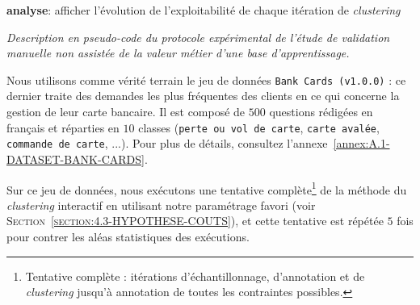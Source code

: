 			\begin{algorithm}
				\textbf{analyse}: afficher l'évolution de l'exploitabilité de chaque itération de \textit{clustering} \;
				\caption{\textit{
					Description en pseudo-code du protocole expérimental de l'étude de validation manuelle non assistée de la valeur métier d'une base d'apprentissage.
				}}
				\label{algorithm:4.4.1-ETUDE-PERTINENCE-VALIDATION-MANUELLE-PROTOCOLE}
			\end{algorithm}
			
			Nous utilisons comme vérité terrain le jeu de données \texttt{Bank Cards (v1.0.0)} : ce dernier traite des demandes les plus fréquentes des clients en ce qui concerne la gestion de leur carte bancaire.
			Il est composé de $500$ questions rédigées en français et réparties en $10$ classes (\texttt{perte ou vol de carte}, \texttt{carte avalée}, \texttt{commande de carte}, ...).
			Pour plus de détails, consultez l'annexe~\ref{annex:A.1-DATASET-BANK-CARDS}.
			
			Sur ce jeu de données, nous exécutons une tentative complète\footnote{
				Tentative complète : itérations d'échantillonnage, d'annotation et de \textit{clustering} jusqu'à annotation de toutes les contraintes possibles.
			}
			de la méthode du \textit{clustering} interactif en utilisant notre paramétrage favori (voir \textsc{Section~\ref{section:4.3-HYPOTHESE-COUTS}}), et cette tentative est répétée $5$ fois pour contrer les aléas statistiques des exécutions.
			
